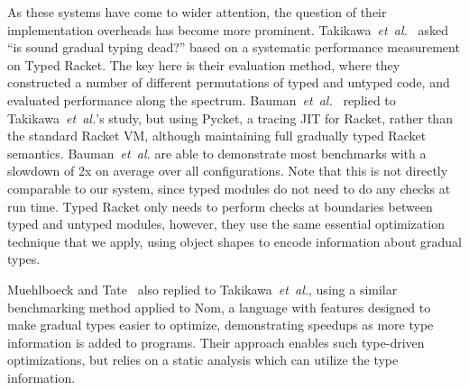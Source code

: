 As these systems have come to wider attention, the question of their
implementation overheads has become more prominent.  
Takikawa~\textit{et~al.}~\cite{Takikawa2016} asked ``is sound gradual typing
dead?'' based on a systematic performance measurement on Typed Racket.
The key here is their evaluation method, where they constructed a
number of different permutations of typed and untyped code, and
evaluated performance along the spectrum.
Bauman~\textit{et~al.}~\cite{Bauman2017} replied to Takikawa~\textit{et~al.}'s study, but
using Pycket\citep{Pycket2015}, a tracing JIT for Racket, rather
than the standard Racket VM, although maintaining full gradually typed
Racket semantics. Bauman~\textit{et~al.} are able to demonstrate most benchmarks
with a slowdown of 2x on average over all configurations.
Note that this is not directly comparable to our system,
since typed modules do not need to do any checks at run time.
Typed Racket only needs to perform checks at boundaries between typed and untyped modules,
however, they use the same essential optimization technique that we apply,
using object shapes to encode information about gradual types.


Muehlboeck and Tate~\cite{Muehlboeck2017} also replied to
Takikawa~\textit{et~al.}, 
using a similar benchmarking method applied to Nom, a language
with features designed to make gradual types easier to optimize, 
demonstrating speedups as more type information is added to programs.
Their approach enables such type-driven optimizations,
but relies on a static analysis which can utilize the type information.




